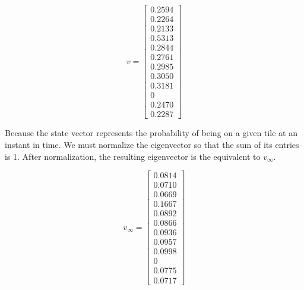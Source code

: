 \documentclass[fleqn]{article}
\begin{document}
\begin{enumerate}[nolistsep]
\begin{enumerate}
			\begin{equation*}
				v = \begin{bmatrix}
					0.2594 \\ 
					0.2264 \\
					0.2133 \\
					0.5313 \\
					0.2844 \\
					0.2761 \\
					0.2985 \\
					0.3050 \\
					0.3181 \\
					0 \\
					0.2470\\
					0.2287
				\end{bmatrix}
			\end{equation*}
			
			Because the state vector represents the probability of being on a given tile at an instant in time. We must normalize the eigenvector so that the sum of its entries is 1. After normalization, the resulting eigenvector is the equivalent to $v_{\infty}$.
			
			 \begin{equation*}
			 	v_{\infty} = \begin{bmatrix}
			 		0.0814 \\
			 		0.0710 \\
			 		0.0669 \\
			 		0.1667 \\
			 		0.0892 \\
			 		0.0866 \\
			 		0.0936 \\
			 		0.0957 \\
			 		0.0998 \\
			 		0 \\
			 		0.0775 \\
			 		0.0717
			 	\end{bmatrix}
			 \end{equation*}			
		\end{enumerate}
	\end{enumerate}
\end{document}
